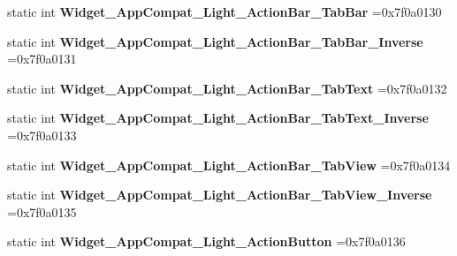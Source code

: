 \begin{DoxyCompactItemize}
static int {\bfseries Widget\+\_\+\+App\+Compat\+\_\+\+Light\+\_\+\+Action\+Bar\+\_\+\+Tab\+Bar} =0x7f0a0130
\item 
\mbox{\label{classandroid_1_1support_1_1v7_1_1mediarouter_1_1R_1_1style_a5a86b4fd791cb3f3a378f90003e07f4a}} 
static int {\bfseries Widget\+\_\+\+App\+Compat\+\_\+\+Light\+\_\+\+Action\+Bar\+\_\+\+Tab\+Bar\+\_\+\+Inverse} =0x7f0a0131
\item 
\mbox{\label{classandroid_1_1support_1_1v7_1_1mediarouter_1_1R_1_1style_a644551f2a033ddc7ce173bc3ef6ae7a2}} 
static int {\bfseries Widget\+\_\+\+App\+Compat\+\_\+\+Light\+\_\+\+Action\+Bar\+\_\+\+Tab\+Text} =0x7f0a0132
\item 
\mbox{\label{classandroid_1_1support_1_1v7_1_1mediarouter_1_1R_1_1style_a77faa85e0c51c536f402044e00c0cdf1}} 
static int {\bfseries Widget\+\_\+\+App\+Compat\+\_\+\+Light\+\_\+\+Action\+Bar\+\_\+\+Tab\+Text\+\_\+\+Inverse} =0x7f0a0133
\item 
\mbox{\label{classandroid_1_1support_1_1v7_1_1mediarouter_1_1R_1_1style_a11bb3d0e571cadf7b0495aea272e8a29}} 
static int {\bfseries Widget\+\_\+\+App\+Compat\+\_\+\+Light\+\_\+\+Action\+Bar\+\_\+\+Tab\+View} =0x7f0a0134
\item 
\mbox{\label{classandroid_1_1support_1_1v7_1_1mediarouter_1_1R_1_1style_a1af20d63ee216a645b0920966a4d0ddc}} 
static int {\bfseries Widget\+\_\+\+App\+Compat\+\_\+\+Light\+\_\+\+Action\+Bar\+\_\+\+Tab\+View\+\_\+\+Inverse} =0x7f0a0135
\item 
\mbox{\label{classandroid_1_1support_1_1v7_1_1mediarouter_1_1R_1_1style_a84dcb765801c41b42969238b33011a45}} 
static int {\bfseries Widget\+\_\+\+App\+Compat\+\_\+\+Light\+\_\+\+Action\+Button} =0x7f0a0136
\item 
\mbox{\label{classandroid_1_1support_1_1v7_1_1mediarouter_1_1R_1_1style_a794175c85a1f3183db71301c2716b850}} 

\end{DoxyCompactItemize}
